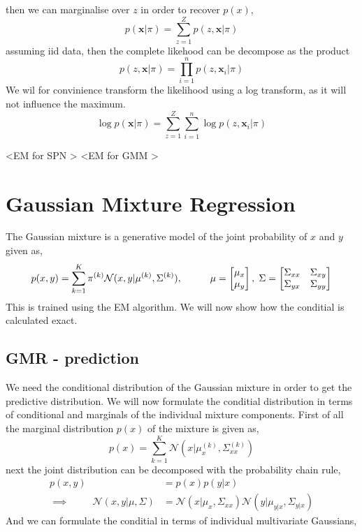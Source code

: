 then we can marginalise over
    $z$ in order to recover $p(x)$, 
    $$p(\textbf{x}|\pi) = \sum_{z=1}^Z p(z,\textbf{x}|\pi) $$
    assuming iid data, then the complete likehood can be decompose as the product 
    $$ p(z,\textbf{x}|\pi) = \prod_{i=1}^n p(z,\textbf{x}_i|\pi)$$
    We wil for convinience transform the likelihood using a log transform, 
    as it will not influence the maximum. 
    $$\log p(\textbf{x}|\pi) = \sum_{z=1}^Z \sum_{i=1}^n \log p(z,\textbf{x}_i|\pi)$$

<EM for SPN >
<EM for GMM >




\section{Gaussian Mixture Regression}
The Gaussian mixture is a generative model of the joint probability of $x$ and $y$ given as, 
$$p(x,y)= \sum_{k=1}^K \pi^{(k)} \mathcal{N}(x,y|\mu^{(k)},\Sigma^{(k)}), 
\hspace{1cm} \mu=\begin{bmatrix}
    \mu_x \\ \mu_y
\end{bmatrix},\hspace{0.1cm} \Sigma = \begin{bmatrix}
    \Sigma_{xx} & \Sigma_{xy}\\ \Sigma_{yx}& \Sigma_{yy}
\end{bmatrix}$$
This is trained using the EM algorithm. We will now show how the conditial is
calculated exact. 
\subsection{GMR - prediction}
We need the conditional distribution of the Gaussian mixture
in order to get the predictive distribution. We will now formulate
the conditial distribution in terms of conditional and marginals of
the individual mixture components. First of all the marginal distribution $p(x)$ 
of the mixture is given as, 
$$p(x) = \sum_{k=1}^K \mathcal{N}(x|\mu_{x}^{(k)},\Sigma_{xx}^{(k)})$$ 
next the joint distribution can be decomposed with the probability chain rule,
\begin{align*}
    p(x,y) &= p(x)p(y|x)\\
    \implies \hspace{1cm} \mathcal{N}(x,y|\mu,\Sigma) &= 
    \mathcal{N}(x|\mu_{x},\Sigma_{xx}) \mathcal{N}(y|\mu_{y|x},\Sigma_{y|x})
\end{align*} 
And we can formulate the conditial in terms of individual multivariate Gaussians, 

